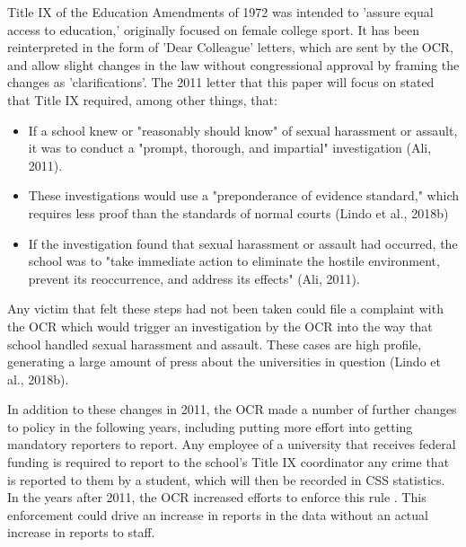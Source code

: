\documentclass[AER]{AEA}
\begin{document}
Title IX of the Education Amendments of 1972 was intended to 'assure equal access to education,' originally focused on female college sport. It has been reinterpreted in the form of 'Dear Colleague' letters, which are sent by the OCR, and allow slight changes in the law without congressional approval by framing the changes as 'clarifications'. The 2011 letter that this paper will focus on stated that Title IX required, among other things, that:

\begin{itemize}

\item If a school knew or "reasonably should know" of sexual harassment or assault, it was to conduct a "prompt, thorough, and impartial" investigation (Ali, 2011).

\item These investigations would use a "preponderance of evidence standard," which requires less proof than the standards of normal courts (Lindo et al., 2018b)

\item If the investigation found that sexual harassment or assault had occurred, the school was to "take immediate action to eliminate the hostile environment, prevent its reoccurrence, and address its effects" (Ali, 2011). 

\end{itemize}

Any victim that felt these steps had not been taken could file a complaint with the OCR which would trigger an investigation by the OCR into the way that school handled sexual harassment and assault. These cases are high profile, generating a large amount of press about the universities in question (Lindo et al., 2018b). 

In addition to these changes in 2011, the OCR made a number of further changes to policy in the following years, including putting more effort into getting mandatory reporters to report. Any employee of a university that receives federal funding is required to report to the school's Title IX coordinator any crime that is reported to them by a student, which will then be recorded in CSS statistics. In the years after 2011, the OCR increased efforts to enforce this rule . This enforcement could drive an increase in reports in the data without an actual increase in reports to staff.
\end{document}
